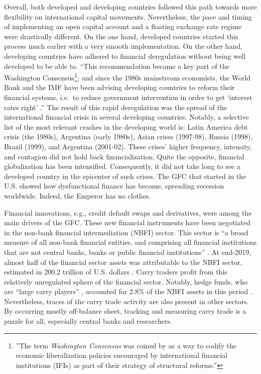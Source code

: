 \documentclass[a4paper, twoside]{templates/ociamthesis}
\begin{document}
Overall, both developed and developing countries followed this path towards more flexibility on international capital movements. Nevertheless, the pace and timing of implementing an open capital account and a floating exchange rate regime were drastically different. On the one hand, developed countries started this process much earlier with a very smooth implementation. On the other hand, developing countries have adhered to financial deregulation without being well developed to be able to. ``This recommendation became a key part of the Washington Consensus\footnote{''The term \emph{Washington Consensus} was coined by \textcite{williamson1990} as a way to codify the economic liberalization policies encouraged by international financial institutions (IFIs) as part of their strategy of structural reforms.''\autocite[ 293]{ocampo2004}}; and since the 1980s mainstream economists, the World Bank and the IMF have been advising developing countries to reform their financial systems, i.e.~to reduce government intervention in order to get `interest rates right' \autocites[ 169]{worldbank1989,long1991}.'' \autocite[ 63]{karwowski2017} The result of this rapid deregulation was the spread of the international financial crisis in several developing countries. Notably, a selective list of the most relevant crashes in the developing world is: Latin America debt crisis (the 1980s), Argentina (early 1980s), Asian crises (1997-98), Russia (1998), Brazil (1999), and Argentina (2001-02). These crises' higher frequency, intensity, and contagion did not hold back financialization. Quite the opposite, financial globalization has been intensified. Consequently, it did not take long to see a developed country in the epicenter of such crises. The GFC that started in the U.S. showed how dysfunctional finance has become, spreading recession worldwide. Indeed, the Emperor has no clothes.

Financial innovations, e.g., credit default swaps and derivatives, were among the main drivers of the GFC. These new financial instruments have been negotiated in the non-bank financial intermediation (NBFI) sector. This sector is ``a broad measure of all non-bank financial entities, and comprising all financial institutions that are not central banks, banks or public financial institutions'' \autocite[ 3]{financialstabilityboard2020}. At end-2019, almost half of the financial sector assets was attributable to the NBFI sector, estimated in 200.2 trillion of U.S. dollars \autocite{financialstabilityboard2020}. Carry traders profit from this relatively unregulated sphere of the financial sector. Notably, hedge funds, who are ``large carry players'' \autocite[ 75]{gabor2015}, accounted for 2.8\% of the NBFI assets in this period \autocite{financialstabilityboard2020}. Nevertheless, traces of the carry trade activity are also present in other sectors. By occurring mostly off-balance sheet, tracking and measuring carry trade is a puzzle for all, especially central banks and researchers.
\end{document}
